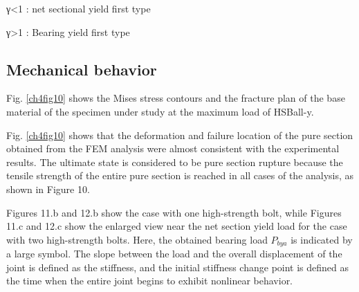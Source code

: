 γ<1 : net sectional yield first type


γ>1 : Bearing yield first type %


\subsection{Mechanical behavior}

Fig. \ref{ch4fig10} shows the Mises stress contours and the fracture plan of the base material of the specimen under study at the maximum load of HSBall-y.

Fig. \ref{ch4fig10} shows that the deformation and failure location of the pure section obtained from the FEM analysis were almost consistent with the experimental results. The ultimate state is considered to be pure section rupture because the tensile strength of the entire pure section is reached in all cases of the analysis, as shown in Figure 10.


Figures 11.b and 12.b show the case with one high-strength bolt, while Figures 11.c and 12.c show the enlarged view near the net section yield load for the case with two high-strength bolts. Here, the obtained bearing load $P_{bya}$ is indicated by a large symbol. The slope between the load and the overall displacement of the joint is defined as the stiffness, and the initial stiffness change point is defined as the time when the entire joint begins to exhibit nonlinear behavior.

